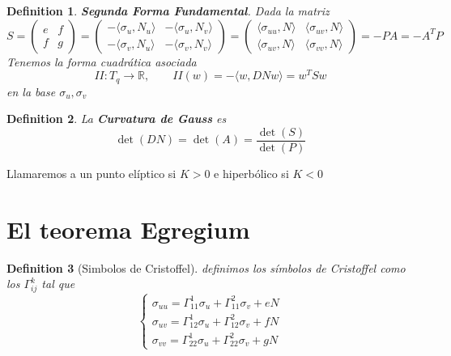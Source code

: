 \documentclass[leqno]{article}
\newtheorem*{definition}{Definition}
\begin{document}
\begin{definition}
\textbf{Segunda Forma Fundamental}. Dada la matriz
\[
  S = \begin{pmatrix} e & f \\ f & g \end{pmatrix} = \begin{pmatrix} -\langle \sigma _u , N_u \rangle & -\langle \sigma _u , N_v \rangle \\ -\langle \sigma _v , N_u \rangle & -\langle \sigma _v , N_v \rangle   \end{pmatrix} =   \begin{pmatrix} \langle \sigma _{uu} , N \rangle & \langle \sigma _{uv} , N \rangle \\ \langle \sigma _{uv} , N \rangle & \langle \sigma _{vv} , N \rangle   \end{pmatrix} =  -PA = -A^TP 
\] 
Tenemos la forma cuadrática asociada
\[
II: T_q\to \mathbb{R}, \qquad II(w) = -\langle w , DNw \rangle = w^TSw
\] 
en la base $\sigma _u, \sigma _v$
\end{definition}

\begin{definition}
La \textbf{Curvatura de Gauss} es
\[
\det(DN) = \det(A) = \frac{\det(S)}{\det(P)}
\] 
\end{definition}
Llamaremos a un punto elíptico si $K>0$ e hiperbólico si $K<0$


\section{El teorema Egregium}
\begin{definition}[Simbolos de Cristoffel]
  definimos los símbolos de Cristoffel como los $\Gamma_{ij}^k$ tal que
  \[
  \begin{cases}
    \sigma _{uu} = \Gamma_{11}^1\sigma _u + \Gamma_{11}^2 \sigma _v + eN \\
    \sigma _{uv} = \Gamma_{12}^1\sigma _u + \Gamma_{12}^2 \sigma _v + fN \\
    \sigma _{vv} = \Gamma_{22}^1\sigma _u + \Gamma_{22}^2 \sigma _v + gN
  \end{cases}
  \] 
\end{definition}
\end{document}
